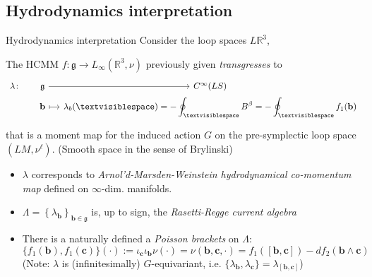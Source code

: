 \documentclass[handout,10pt]{beamer}
\begin{document}
  \subsection{Hydrodynamics interpretation}
  \begin{frame}[fragile]{Hydrodynamics interpretation}
		Consider the loop spaces $L{\mathbb R}^3$,\\
		\begin{propblock}
			The HCMM $f \colon \mathfrak{g} \to L_{\infty}(\mathbb{R}^3,\nu)$ previously given
			\emph{transgresses}	 to
			\begin{displaymath}%
				\begin{tikzcd}[column sep= small,row sep=0ex]
					\lambda \colon& \mathfrak{g}	\arrow[r]& C^\infty(LS) \\
					& {\mathbf b}	\arrow[r, mapsto]& \displaystyle \lambda_b(\textvisiblespace) =-\oint_{\textvisiblespace} B^\beta = - \oint_{\textvisiblespace} f_1({\mathbf b}) 
				\end{tikzcd}	
			\end{displaymath}
			that is a  moment map for the induced action $G$ on the pre-symplectic loop space $(LM,\nu^{\ell})$. (Smooth space in the sense of Brylinski)
		\end{propblock}
		\begin{itemize}
			\item $\lambda$ corresponds to \emph{Arnol'd-Marsden-Weinstein hydrodynamical co-momentum map}  defined on $\infty$-dim. manifolds.
			\item<2-> $\Lambda = \left\lbrace \lambda_{\mathbf b} \right\rbrace_{{\mathbf b}\in\mathfrak{g}}$ is, up to sign, the {\it Rasetti-Regge current algebra}
			\item<3-> There is a naturally defined a {\it Poisson brackets} on $\Lambda$:
				\begin{displaymath}
					\{ f_1({\mathbf b}), f_1({\mathbf c}) \} (\cdot):= \iota_{\mathbf c} \iota_{\mathbf b} \nu (\cdot)=
						\nu({\mathbf b}, {\mathbf c}, \cdot) = f_1([{\mathbf b},{\mathbf c}])
					-df_2 ({\mathbf b} \wedge {\mathbf c})
				\end{displaymath}
				\centering\footnotesize(Note: $\lambda$ is (infinitesimally) $G$-equivariant, i.e. $	\{\lambda_{\mathbf b}, \lambda_{\mathbf c} \} = \lambda_{[{\mathbf b}, {\mathbf c}]}$)
		\end{itemize}

    
  \end{frame}
\end{document}
